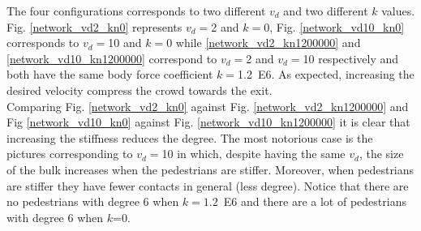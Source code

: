\documentclass[preprint,12pt]{elsarticle}
\begin{document}
The four configurations corresponds to two different $v_d$ and two different $k$ values. Fig. \ref{network_vd2_kn0} represents $v_d=$2 and $k=0$, Fig. \ref{network_vd10_kn0} corresponds to $v_d=$10 and $k=0$ while \ref{network_vd2_kn1200000} and \ref{network_vd10_kn1200000} correspond to $v_d=$2 and $v_d=$10 respectively and both have the same body force coefficient $k=$1.2~E6. As expected, increasing the desired velocity compress the crowd towards the exit. \\

Comparing Fig. \ref{network_vd2_kn0} against Fig. \ref{network_vd2_kn1200000} and Fig \ref{network_vd10_kn0} against Fig. \ref{network_vd10_kn1200000} it is clear that increasing the stiffness reduces the degree. The most notorious case is the pictures corresponding to $v_d=$10 in which, despite having the same $v_d$, the size of the bulk increases when the pedestrians are stiffer. Moreover, when pedestrians are stiffer they have fewer contacts in general (less degree). Notice that there are no pedestrians with degree 6 when $k=1.2$~E6 and there are a lot of pedestrians with degree 6 when $k$=0.
\end{document}
